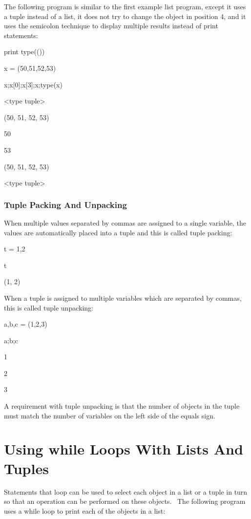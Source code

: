 \documentclass[12pt,twoside]{book}
\begin{document}
The following program is similar to the first example list program,
except it uses a tuple instead of a list, it does not try to change the
object in position 4, and it uses the semicolon technique to display
multiple results instead of print statements:


\bigskip

print type(())

x = (50,51,52,53)

x;x[0];x[3];x;type(x)

{\textbar}

{\textless}type {\textquotesingle}tuple{\textquotesingle}{\textgreater}

(50, 51, 52, 53)

50

53

(50, 51, 52, 53)

{\textless}type {\textquotesingle}tuple{\textquotesingle}{\textgreater}


\bigskip

\subsubsection[Tuple Packing And Unpacking]{Tuple Packing And Unpacking}

When multiple values separated by commas are assigned to a single
variable, the values are automatically placed into a tuple and this is
called tuple packing:


\bigskip

t = 1,2

t

{\textbar}

(1, 2)

When a tuple is assigned to multiple variables which are separated by
commas, this is called tuple unpacking:


\bigskip

a,b,c = (1,2,3)

a;b;c

{\textbar}

1

2

3

A requirement with tuple unpacking is that the number of objects in the
tuple must match the number of variables on the left side of the equals
sign.

\section[Using while Loops With Lists And Tuples]{Using
while Loops With Lists And Tuples}
Statements that loop can be used to select each object in a list or a
tuple in turn so that an operation can be performed on these objects.
\ The following program uses a while loop to print each of the objects
in a list:
\end{document}
